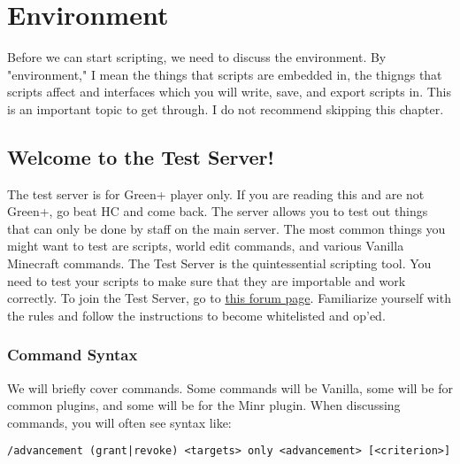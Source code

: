 \documentclass[oneside]{book}
\begin{document}
\hypersetup{linkcolor=black}
\tableofcontents
\hypersetup{linkcolor=blue}

\mainmatter
\pagestyle{plain}

\chapter{Environment}
Before we can start scripting, we need to discuss the environment. By "environment," I mean the things that scripts are embedded in, the thigngs that scripts affect and interfaces which you will write, save, and export scripts in. This is an important topic to get through. I do not recommend skipping this chapter.

\section{Welcome to the Test Server!}
The test server is for Green+ player only. If you are reading this and are not Green+, go beat HC and come back. The server allows you to test out things that can only be done by staff on the main server. The most common things you might want to test are scripts, world edit commands, and various Vanilla Minecraft commands. The Test Server is the quintessential scripting tool. You need to test your scripts to make sure that they are importable and work correctly. To join the Test Server, go to \href{https://forums.minr.org/pages/testserver/}{this forum page}. Familiarize yourself with the rules and follow the instructions to become whitelisted and op'ed.

\subsection{Command Syntax}

We will briefly cover commands. Some commands will be Vanilla, some will be for common plugins, and some will be for the Minr plugin. When discussing commands, you will often see syntax like:

\begin{verbatim}
/advancement (grant|revoke) <targets> only <advancement> [<criterion>]
\end{verbatim}
\end{document}
